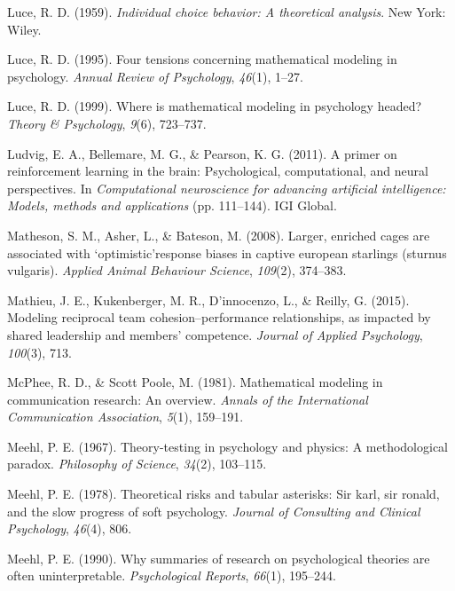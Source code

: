 \documentclass[english,,man]{apa6}
\theoremstyle{definition}
\theoremstyle{definition}
\theoremstyle{definition}
\theoremstyle{remark}
\begin{document}
\leavevmode\hypertarget{ref-luce1959}{}%
Luce, R. D. (1959). \emph{Individual choice behavior: A theoretical
analysis}. New York: Wiley.

\leavevmode\hypertarget{ref-luce1995}{}%
Luce, R. D. (1995). Four tensions concerning mathematical modeling in
psychology. \emph{Annual Review of Psychology}, \emph{46}(1), 1--27.

\leavevmode\hypertarget{ref-luce1999}{}%
Luce, R. D. (1999). Where is mathematical modeling in psychology headed?
\emph{Theory \& Psychology}, \emph{9}(6), 723--737.

\leavevmode\hypertarget{ref-ludvig2011}{}%
Ludvig, E. A., Bellemare, M. G., \& Pearson, K. G. (2011). A primer on
reinforcement learning in the brain: Psychological, computational, and
neural perspectives. In \emph{Computational neuroscience for advancing
artificial intelligence: Models, methods and applications} (pp.
111--144). IGI Global.

\leavevmode\hypertarget{ref-matheson2008}{}%
Matheson, S. M., Asher, L., \& Bateson, M. (2008). Larger, enriched
cages are associated with `optimistic'response biases in captive
european starlings (sturnus vulgaris). \emph{Applied Animal Behaviour
Science}, \emph{109}(2), 374--383.

\leavevmode\hypertarget{ref-mathieu2015}{}%
Mathieu, J. E., Kukenberger, M. R., D'innocenzo, L., \& Reilly, G.
(2015). Modeling reciprocal team cohesion--performance relationships, as
impacted by shared leadership and members' competence. \emph{Journal of
Applied Psychology}, \emph{100}(3), 713.

\leavevmode\hypertarget{ref-mcphee1981}{}%
McPhee, R. D., \& Scott Poole, M. (1981). Mathematical modeling in
communication research: An overview. \emph{Annals of the International
Communication Association}, \emph{5}(1), 159--191.

\leavevmode\hypertarget{ref-meehl1967}{}%
Meehl, P. E. (1967). Theory-testing in psychology and physics: A
methodological paradox. \emph{Philosophy of Science}, \emph{34}(2),
103--115.

\leavevmode\hypertarget{ref-meehl1978}{}%
Meehl, P. E. (1978). Theoretical risks and tabular asterisks: Sir karl,
sir ronald, and the slow progress of soft psychology. \emph{Journal of
Consulting and Clinical Psychology}, \emph{46}(4), 806.

\leavevmode\hypertarget{ref-Meehl1990}{}%
Meehl, P. E. (1990). Why summaries of research on psychological theories
are often uninterpretable. \emph{Psychological Reports}, \emph{66}(1),
195--244.
\end{document}
